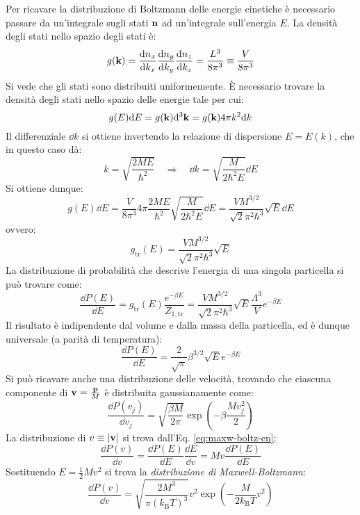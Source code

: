Per ricavare la distribuzione di Boltzmann delle energie cinetiche è necessario passare da un'integrale sugli stati $ \mathbf{n} $ ad un'integrale sull'energia $ E $. La densità degli stati nello spazio degli stati è:
\begin{equation}
	g(\mathbf{k}) = \frac{\mathrm{d} n_x}{\mathrm{d} k_x} \frac{\mathrm{d} n_y}{\mathrm{d} k_y} \frac{\mathrm{d} n_z}{\mathrm{d} k_z} = \frac{L^3}{8\pi^3} \equiv \frac{V}{8\pi^3}
	\label{eq:dens-k}
\end{equation}
Si vede che gli stati sono distribuiti uniformemente. È necessario trovare la densità degli stati nello spazio delle energie tale per cui:
\begin{equation*}
	g(E) \mathrm{d} E = g(\mathbf{k}) \mathrm{d}^3\mathbf{k} = g(\mathbf{k}) 4\pi k^2 \mathrm{d} k
\end{equation*}
Il differenziale $ \dd k $ si ottiene invertendo la relazione di dispersione $ E = E(k) $, che in questo caso dà:
\begin{equation*}
	k = \sqrt{\frac{2M E}{\hbar^2}}
	\quad \Rightarrow \quad
	\dd k = \sqrt{\frac{M}{2\hbar^2 E}} \dd E
\end{equation*}
Si ottiene dunque:
\begin{equation*}
	g(E) \dd E = \frac{V}{8\pi^3} 4 \pi \frac{2M E}{\hbar^2} \sqrt{\frac{M}{2\hbar^2 E}} \dd E = \frac{V M^{3/2}}{\sqrt{2} \pi^2 \hbar^3} \sqrt{E} \dd E
\end{equation*}
ovvero:
\begin{equation}
	g_\text{tr}(E) = \frac{V M^{3/2}}{\sqrt{2} \pi^2 \hbar^3} \sqrt{E}
	\label{eq:en-deg}
\end{equation}
La distribuzione di probabilità che descrive l'energia di una singola particella si può trovare come:
\begin{equation*}
	\frac{\dd P(E)}{\dd E} = g_\text{tr}(E) \frac{e^{- \beta E}}{Z_{1,\text{tr}}} = \frac{V M^{3/2}}{\sqrt{2} \pi^2 \hbar^3} \sqrt{E} \frac{\Lambda^3}{V} e^{-\beta E}
\end{equation*}
Il risultato è indipendente dal volume e dalla massa della particella, ed è dunque universale (a parità di temperatura):
\begin{equation}
	\frac{\dd P(E)}{\dd E} = \frac{2}{\sqrt{\pi}} \beta^{3/2} \sqrt{E} e^{-\beta E}
	\label{eq:maxw-boltz-en}
\end{equation}
Si può ricavare anche una distribuzione delle velocità, trovando che ciascuna componente di $ \mathbf{v} = \frac{\mathbf{p}}{M} $ è distribuita gaussianamente come:
\begin{equation*}
	\frac{\dd P(v_j)}{\dd v_j} = \sqrt{\frac{\beta M}{2\pi}} \exp \left( -\beta \frac{M v_j^2}{2} \right)
\end{equation*}
La distribuzione di $ v \equiv \left\lvert\mathbf{v}\right\rvert $ si trova dall'Eq. \ref{eq:maxw-boltz-en}:
\begin{equation*}
	\frac{\dd P(v)}{\dd v} = \frac{\dd P(E)}{\dd E} \frac{\dd E}{\dd v} = M v \frac{\dd P(E)}{\dd E}
\end{equation*}
Sostituendo $ E = \frac{1}{2} M v^2 $ si trova la \textit{distribuzione di Maxwell-Boltzmann}:
\begin{equation}
	\frac{\dd P(v)}{\dd v} = \sqrt{\frac{2 M^3}{\pi (k_\text{B} T)^3}} v^2 \exp \left( - \frac{M}{2 k_\text{B} T} v^2 \right)
\end{equation}

